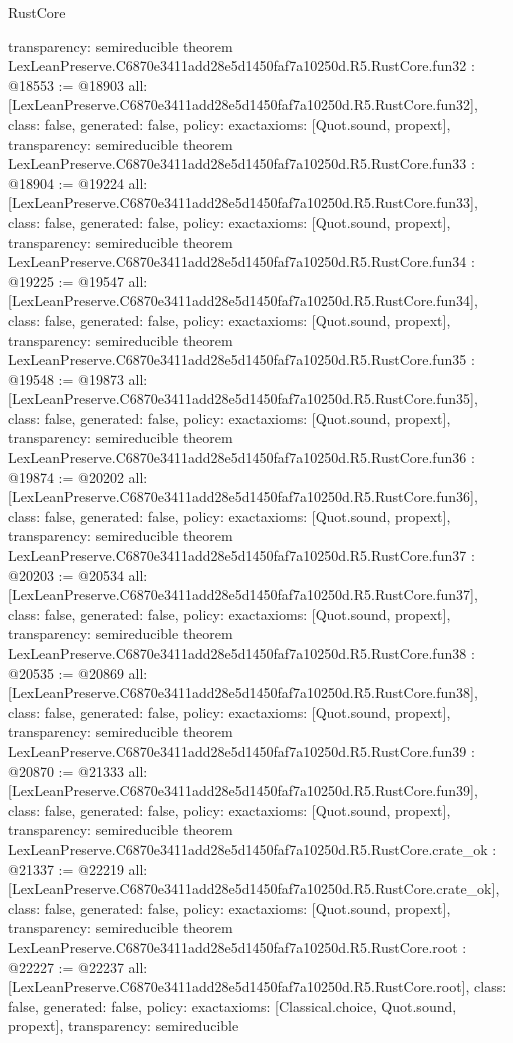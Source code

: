 \begin{lexlean}{RustCore}
\begin{coremodule}
{  transparency: semireducible
}
theorem LexLeanPreserve.C6870e3411add28e5d1450faf7a10250d.R5.RustCore.fun32 : @18553 := @18903 {
  all: [LexLeanPreserve.C6870e3411add28e5d1450faf7a10250d.R5.RustCore.fun32],
  class: false,
  generated: false,
  policy: exact{axioms: [Quot.sound, propext]},
  transparency: semireducible
}
theorem LexLeanPreserve.C6870e3411add28e5d1450faf7a10250d.R5.RustCore.fun33 : @18904 := @19224 {
  all: [LexLeanPreserve.C6870e3411add28e5d1450faf7a10250d.R5.RustCore.fun33],
  class: false,
  generated: false,
  policy: exact{axioms: [Quot.sound, propext]},
  transparency: semireducible
}
theorem LexLeanPreserve.C6870e3411add28e5d1450faf7a10250d.R5.RustCore.fun34 : @19225 := @19547 {
  all: [LexLeanPreserve.C6870e3411add28e5d1450faf7a10250d.R5.RustCore.fun34],
  class: false,
  generated: false,
  policy: exact{axioms: [Quot.sound, propext]},
  transparency: semireducible
}
theorem LexLeanPreserve.C6870e3411add28e5d1450faf7a10250d.R5.RustCore.fun35 : @19548 := @19873 {
  all: [LexLeanPreserve.C6870e3411add28e5d1450faf7a10250d.R5.RustCore.fun35],
  class: false,
  generated: false,
  policy: exact{axioms: [Quot.sound, propext]},
  transparency: semireducible
}
theorem LexLeanPreserve.C6870e3411add28e5d1450faf7a10250d.R5.RustCore.fun36 : @19874 := @20202 {
  all: [LexLeanPreserve.C6870e3411add28e5d1450faf7a10250d.R5.RustCore.fun36],
  class: false,
  generated: false,
  policy: exact{axioms: [Quot.sound, propext]},
  transparency: semireducible
}
theorem LexLeanPreserve.C6870e3411add28e5d1450faf7a10250d.R5.RustCore.fun37 : @20203 := @20534 {
  all: [LexLeanPreserve.C6870e3411add28e5d1450faf7a10250d.R5.RustCore.fun37],
  class: false,
  generated: false,
  policy: exact{axioms: [Quot.sound, propext]},
  transparency: semireducible
}
theorem LexLeanPreserve.C6870e3411add28e5d1450faf7a10250d.R5.RustCore.fun38 : @20535 := @20869 {
  all: [LexLeanPreserve.C6870e3411add28e5d1450faf7a10250d.R5.RustCore.fun38],
  class: false,
  generated: false,
  policy: exact{axioms: [Quot.sound, propext]},
  transparency: semireducible
}
theorem LexLeanPreserve.C6870e3411add28e5d1450faf7a10250d.R5.RustCore.fun39 : @20870 := @21333 {
  all: [LexLeanPreserve.C6870e3411add28e5d1450faf7a10250d.R5.RustCore.fun39],
  class: false,
  generated: false,
  policy: exact{axioms: [Quot.sound, propext]},
  transparency: semireducible
}
theorem LexLeanPreserve.C6870e3411add28e5d1450faf7a10250d.R5.RustCore.crate_ok : @21337 := @22219 {
  all: [LexLeanPreserve.C6870e3411add28e5d1450faf7a10250d.R5.RustCore.crate_ok],
  class: false,
  generated: false,
  policy: exact{axioms: [Quot.sound, propext]},
  transparency: semireducible
}
theorem LexLeanPreserve.C6870e3411add28e5d1450faf7a10250d.R5.RustCore.root : @22227 := @22237 {
  all: [LexLeanPreserve.C6870e3411add28e5d1450faf7a10250d.R5.RustCore.root],
  class: false,
  generated: false,
  policy: exact{axioms: [Classical.choice, Quot.sound, propext]},
  transparency: semireducible
}


\end{coremodule}
\end{lexlean}
